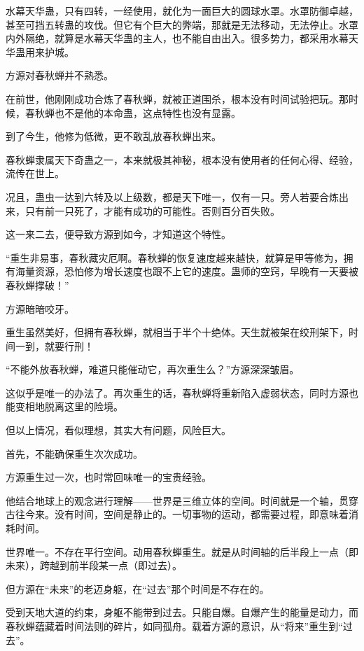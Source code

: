 
\begin{this_body}

水幕天华蛊，只有四转，一经使用，就化为一面巨大的圆球水罩。水罩防御卓越，甚至可挡五转蛊的攻伐。但它有个巨大的弊端，那就是无法移动，无法停止。水罩内外隔绝，就算是水幕天华蛊的主人，也不能自由出入。很多势力，都采用水幕天华蛊用来护城。

方源对春秋蝉并不熟悉。

在前世，他刚刚成功合炼了春秋蝉，就被正道围杀，根本没有时间试验把玩。那时候，春秋蝉也不是他的本命蛊，这点特性也没有显露。

到了今生，他修为低微，更不敢乱放春秋蝉出来。

春秋蝉隶属天下奇蛊之一，本来就极其神秘，根本没有使用者的任何心得、经验，流传在世上。

况且，蛊虫一达到六转及以上级数，都是天下唯一，仅有一只。旁人若要合炼出来，只有前一只死了，才能有成功的可能性。否则百分百失败。

这一来二去，便导致方源到如今，才知道这个特性。

“重生非易事，春秋藏灾厄啊。春秋蝉的恢复速度越来越快，就算是甲等修为，拥有海量资源，恐怕修为增长速度也跟不上它的速度。蛊师的空窍，早晚有一天要被春秋蝉撑破！”

方源暗暗咬牙。

重生虽然美好，但拥有春秋蝉，就相当于半个十绝体。天生就被架在绞刑架下，时间一到，就要行刑！

“不能外放春秋蝉，难道只能催动它，再次重生么？”方源深深皱眉。

这似乎是唯一的办法了。再次重生的话，春秋蝉将重新陷入虚弱状态，同时方源也能变相地脱离这里的险境。

但以上情况，看似理想，其实大有问题，风险巨大。

首先，不能确保重生次次成功。

方源重生过一次，也时常回味唯一的宝贵经验。

他结合地球上的观念进行理解——世界是三维立体的空间。时间就是一个轴，贯穿古往今来。没有时间，空间是静止的。一切事物的运动，都需要过程，即意味着消耗时间。

世界唯一。不存在平行空间。动用春秋蝉重生。就是从时间轴的后半段上一点（即未来），跨越到前半段某一点（即过去）。

但方源在“未来”的老迈身躯，在“过去”那个时间是不存在的。

受到天地大道的约束，身躯不能带到过去。只能自爆。自爆产生的能量是动力，而春秋蝉蕴藏着时间法则的碎片，如同孤舟。载着方源的意识，从“将来”重生到“过去”。


\end{this_body}

